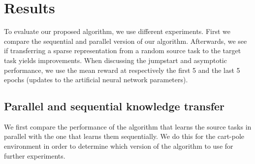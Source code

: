 \section{Results}
To evaluate our proposed algorithm, we use different experiments. First we compare the sequential and parallel version of our algorithm. Afterwards, we see if transferring a sparse representation from a random source task to the target task yields improvements.
When discussing the jumpstart and asymptotic performance, we use the mean reward at respectively the first 5 and the last 5 epochs (updates to the artificial neural network parameters).

\subsection{Parallel and sequential knowledge transfer} %
\label{sub:parallel_and_sequential_knowledge_transfer}
We first compare the performance of the algorithm that learns the source tasks in parallel with the one that learns them sequentially. We do this for the cart-pole environment in order to determine which version of the algorithm to use for further experiments.

